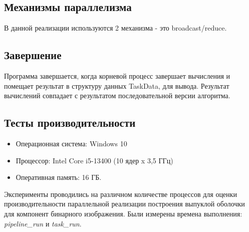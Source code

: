 \documentclass[12pt]{article}
\begin{document}
\subsection*{Механизмы параллелизма}
В данной реализации используются  2 механизма - это broadcast/reduce.

\subsection*{Завершение}
Программа завершается, когда корневой процесс завершает вычисления и помещает результат в структуру данных TaskData, для вывода. Результат вычислений совпадает с результатом последовательной версии алгоритма.

\newpage

\subsection*{Тесты производительности}
\label{subsec:performance_tests}

\begin{itemize}
    \item Операционная система: Windows 10
    \item Процессор: Intel Core i5-13400 (10 ядер x 3,5 ГГц)
    \item Оперативная память: 16 ГБ.
\end{itemize}

Эксперименты проводились на различном количестве процессов для оценки производительности параллельной реализации построения выпуклой оболочки для компонент бинарного изображения. Были измерены времена выполнения: \textit{pipeline\_run} и \textit{task\_run}.
\end{document}

